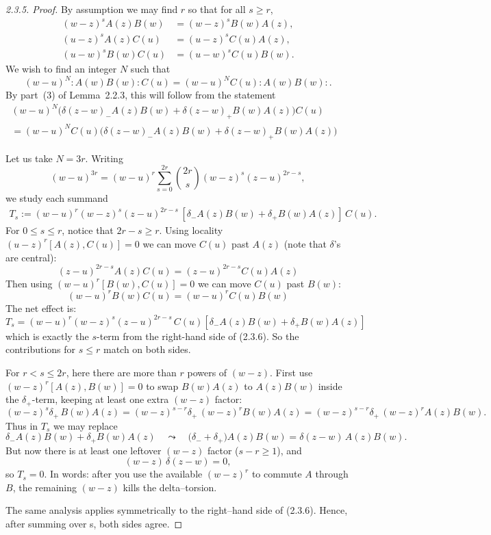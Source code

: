 \documentclass[12pt]{article}
\begin{document}
\begin{proof}[2.3.5. Proof]
By assumption we may find $r$ so that for all $s\ge r$,
\[
\begin{aligned}
(w-z)^s A(z)B(w) &= (w-z)^s B(w)A(z), \\
(u-z)^s A(z)C(u) &= (u-z)^s C(u)A(z), \\
(u-w)^s B(w)C(u) &= (u-w)^s C(u)B(w).
\end{aligned}
\]
We wish to find an integer $N$ such that
\[
(w-u)^N :A(w)B(w):C(u)
= (w-u)^N C(u):A(w)B(w):.
\]
By part~(3) of Lemma~2.2.3, this will follow from the statement
\begin{equation}\label{2.3.6}
\begin{aligned}
(w-u)^N \big( \delta(z-w)_- A(z)B(w) + \delta(z-w)_+ B(w)A(z) \big) C(u)
&\\
= (w-u)^N C(u) \big( \delta(z-w)_- A(z)B(w) + \delta(z-w)_+ B(w)A(z) \big)
\end{aligned}
\end{equation}

Let us take $N = 3r$. Writing
\[
(w-u)^{3r} = (w-u)^r \sum_{s=0}^{2r} \binom{2r}{s} (w-z)^s (z-u)^{2r-s},
\]
we study each summand \begin{align*}
    T_s:=(w-u)^r (w-z)^s (z-u)^{2r-s}\,[\delta_-A(z)B(w)+\delta_+B(w)A(z)]\,C(u).
\end{align*}
For $0\le s\le r$, notice that $2r-s\ge r$. Using locality $(u-z)^r[A(z),C(u)]=0$ we can move $C(u)$ past $A(z)$ (note that $\delta$'s are central):
\[(z-u)^{2r-s}A(z)C(u)=(z-u)^{2r-s}C(u)A(z)\]  
Then using $(w-u)^r[B(w),C(u)]=0$ we can move $C(u)$ past $B(w)$:
\[(w-u)^r B(w)C(u)=(w-u)^r C(u)B(w)\]
The net effect is:
\[T_s=(w-u)^r (w-z)^s (z-u)^{2r-s}\,C(u)[\delta_-A(z)B(w)+\delta_+B(w)A(z)]\]
which is exactly the $s$-term from the right-hand side of (2.3.6). So the contributions for $s\le r$ match on both sides.

For $r<s\le 2r$, here there are more than $r$ powers of $(w-z)$. First use $(w-z)^r[A(z),B(w)]=0$ to swap $B(w)A(z)$ to $A(z)B(w)$ inside the $\delta_+$-term, keeping at least one extra $(w-z)$ factor:
\[(w-z)^s\delta_+\,B(w)A(z)=(w-z)^{s-r}\delta_+\,(w-z)^r B(w)A(z)
=(w-z)^{s-r}\delta_+\, (w-z)^r A(z)B(w).
\]
Thus in $T_s$ we may replace
\[\delta_-A(z)B(w)+\delta_+B(w)A(z)
\quad\leadsto\quad
\big(\delta_-+\delta_+\big)A(z)B(w)=\delta(z-w)\,A(z)B(w).
\]
But now there is at least one leftover $(w-z)$ factor ($s-r\ge 1$), and
\[(w-z)\,\delta(z-w)=0,
\]
so $T_s=0$. In words: after you use the available $(w-z)^r$ to commute $A$ through $B$, the remaining $(w-z)$ kills the delta–torsion.

The same analysis applies symmetrically to the right–hand side of (2.3.6). Hence, after summing over s, both sides agree.
\end{proof}
\end{document}
